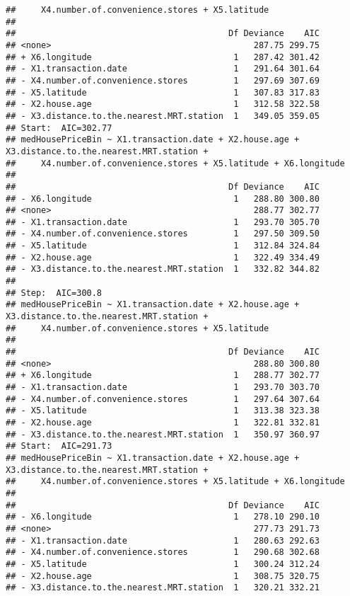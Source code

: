 \documentclass[
]{article}
\begin{document}
\begin{verbatim}
##     X4.number.of.convenience.stores + X5.latitude
## 
##                                          Df Deviance    AIC
## <none>                                        287.75 299.75
## + X6.longitude                            1   287.42 301.42
## - X1.transaction.date                     1   291.64 301.64
## - X4.number.of.convenience.stores         1   297.69 307.69
## - X5.latitude                             1   307.83 317.83
## - X2.house.age                            1   312.58 322.58
## - X3.distance.to.the.nearest.MRT.station  1   349.05 359.05
## Start:  AIC=302.77
## medHousePriceBin ~ X1.transaction.date + X2.house.age + X3.distance.to.the.nearest.MRT.station + 
##     X4.number.of.convenience.stores + X5.latitude + X6.longitude
## 
##                                          Df Deviance    AIC
## - X6.longitude                            1   288.80 300.80
## <none>                                        288.77 302.77
## - X1.transaction.date                     1   293.70 305.70
## - X4.number.of.convenience.stores         1   297.50 309.50
## - X5.latitude                             1   312.84 324.84
## - X2.house.age                            1   322.49 334.49
## - X3.distance.to.the.nearest.MRT.station  1   332.82 344.82
## 
## Step:  AIC=300.8
## medHousePriceBin ~ X1.transaction.date + X2.house.age + X3.distance.to.the.nearest.MRT.station + 
##     X4.number.of.convenience.stores + X5.latitude
## 
##                                          Df Deviance    AIC
## <none>                                        288.80 300.80
## + X6.longitude                            1   288.77 302.77
## - X1.transaction.date                     1   293.70 303.70
## - X4.number.of.convenience.stores         1   297.64 307.64
## - X5.latitude                             1   313.38 323.38
## - X2.house.age                            1   322.81 332.81
## - X3.distance.to.the.nearest.MRT.station  1   350.97 360.97
## Start:  AIC=291.73
## medHousePriceBin ~ X1.transaction.date + X2.house.age + X3.distance.to.the.nearest.MRT.station + 
##     X4.number.of.convenience.stores + X5.latitude + X6.longitude
## 
##                                          Df Deviance    AIC
## - X6.longitude                            1   278.10 290.10
## <none>                                        277.73 291.73
## - X1.transaction.date                     1   280.63 292.63
## - X4.number.of.convenience.stores         1   290.68 302.68
## - X5.latitude                             1   300.24 312.24
## - X2.house.age                            1   308.75 320.75
## - X3.distance.to.the.nearest.MRT.station  1   320.21 332.21

\end{verbatim}
\end{document}
